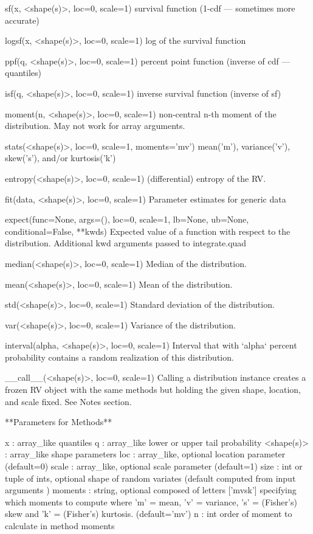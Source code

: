 \begin{DoxyVerb}
sf(x, <shape(s)>, loc=0, scale=1)
    survival function (1-cdf --- sometimes more accurate)

logsf(x, <shape(s)>, loc=0, scale=1)
    log of the survival function

ppf(q, <shape(s)>, loc=0, scale=1)
  percent point function (inverse of cdf --- quantiles)

isf(q, <shape(s)>, loc=0, scale=1)
    inverse survival function (inverse of sf)

moment(n, <shape(s)>, loc=0, scale=1)
    non-central n-th moment of the distribution.  May not work for array
    arguments.

stats(<shape(s)>, loc=0, scale=1, moments='mv')
    mean('m'), variance('v'), skew('s'), and/or kurtosis('k')

entropy(<shape(s)>, loc=0, scale=1)
    (differential) entropy of the RV.

fit(data, <shape(s)>, loc=0, scale=1)
    Parameter estimates for generic data

expect(func=None, args=(), loc=0, scale=1, lb=None, ub=None,
         conditional=False, **kwds)
    Expected value of a function with respect to the distribution.
    Additional kwd arguments passed to integrate.quad

median(<shape(s)>, loc=0, scale=1)
    Median of the distribution.

mean(<shape(s)>, loc=0, scale=1)
    Mean of the distribution.

std(<shape(s)>, loc=0, scale=1)
    Standard deviation of the distribution.

var(<shape(s)>, loc=0, scale=1)
    Variance of the distribution.

interval(alpha, <shape(s)>, loc=0, scale=1)
    Interval that with `alpha` percent probability contains a random
    realization of this distribution.

__call__(<shape(s)>, loc=0, scale=1)
    Calling a distribution instance creates a frozen RV object with the
    same methods but holding the given shape, location, and scale fixed.
    See Notes section.

**Parameters for Methods**

x : array_like
    quantiles
q : array_like
    lower or upper tail probability
<shape(s)> : array_like
    shape parameters
loc : array_like, optional
    location parameter (default=0)
scale : array_like, optional
    scale parameter (default=1)
size : int or tuple of ints, optional
    shape of random variates (default computed from input arguments )
moments : string, optional
    composed of letters ['mvsk'] specifying which moments to compute where
    'm' = mean, 'v' = variance, 's' = (Fisher's) skew and
    'k' = (Fisher's) kurtosis. (default='mv')
n : int
    order of moment to calculate in method moments


\end{DoxyVerb}
